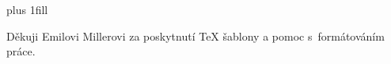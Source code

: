 \vglue 0pt plus 1fill


Děkuji Emilovi Millerovi za poskytnutí TeX šablony a pomoc s~formátováním práce.


\vspace{20mm}
\newpage

